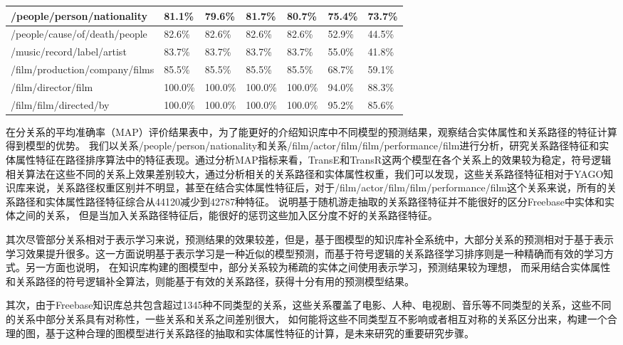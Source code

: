 \begin{table}[htbp]
\begin{tabular}{|p{5.8cm}|p{1.4cm}|p{1.4cm}|p{1.4cm}|p{1.4cm}|p{1.4cm}|p{1.4cm}|}
    \hline
    /people/person/nationality & 81.1\% & 79.6\% & 81.7\% & 80.7\% & 75.4\% & 73.7\% \\
    \hline
    /people/cause/of/death/people & 82.6\% & 82.6\% & 82.6\% & 82.6\% & 52.9\% & 44.5\% \\
    \hline
    /music/record/label/artist & 83.7\% & 83.7\% & 83.7\% & 83.7\% & 55.0\% & 41.8\% \\
    \hline
    /film/production/company/films & 85.5\% & 85.5\% & 85.5\% & 85.5\% & 68.7\% & 59.1\% \\
    \hline
    /film/director/film & 100.0\% & 100.0\% & 100.0\% & 100.0\% & 94.0\% & 88.3\% \\
    \hline
    /film/film/directed/by & 100.0\% & 100.0\% & 100.0\% & 100.0\% & 95.2\% & 85.6\% \\
    \hline
    \end{tabular}%
  \label{tab:addlabel-fb-map}%
\end{table}%

在分关系的平均准确率（MAP）评价结果表中，为了能更好的介绍知识库中不同模型的预测结果，观察结合实体属性和关系路径的特征计算得到模型的优势。
我们以关系/people/person/nationality和关系/film/actor/film/film/performance/film进行分析，研究关系路径特征和实体属性特征在路径排序算法中的特征表现。通过分析MAP指标来看，TransE和TransR这两个模型在各个关系上的效果较为稳定，符号逻辑相关算法在这些不同的关系上效果差别较大，通过分析相关的关系路径和实体属性权重，我们可以发现，这些关系路径特征相对于YAGO知识库来说，关系路径权重区别并不明显，甚至在结合实体属性特征后，对于/film/actor/film/film/performance/film这个关系来说，所有的关系路径和实体属性路径特征综合从44120减少到42787种特征。
说明基于随机游走抽取的关系路径特征并不能很好的区分Freebase中实体和实体之间的关系，
但是当加入关系路径特征后，能很好的惩罚这些加入区分度不好的关系路径特征。

其次尽管部分关系相对于表示学习来说，预测结果的效果较差，但是，基于图模型的知识库补全系统中，大部分关系的预测相对于基于表示学习效果提升很多。这一方面说明基于表示学习是一种近似的模型预测，而基于符号逻辑的关系路径学习排序则是一种精确而有效的学习方式。另一方面也说明，
在知识库构建的图模型中，部分关系较为稀疏的实体之间使用表示学习，预测结果较为理想，
而采用结合实体属性和关系路径的符号逻辑补全算法，则能基于有效的关系路径，获得十分有用的预测模型结果。

其次，由于Freebase知识库总共包含超过1345种不同类型的关系，这些关系覆盖了电影、人种、电视剧、音乐等不同类型的关系，这些不同的关系中部分关系具有对称性，一些关系和关系之间差别很大，
如何能将这些不同类型互不影响或者相互对称的关系区分出来，构建一个合理的图，基于这种合理的图模型进行关系路径的抽取和实体属性特征的计算，是未来研究的重要研究步骤。

